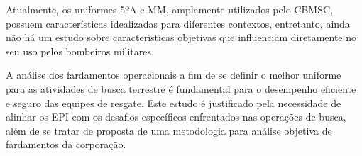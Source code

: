 	Atualmente, os uniformes 5ºA e \acrlong{MM}, amplamente utilizados pelo \acrshort{CBMSC}, possuem características idealizadas para diferentes contextos,
	  entretanto, ainda não há um estudo sobre características objetivas que influenciam diretamente no seu uso pelos bombeiros militares.
	
	  A análise dos fardamentos operacionais a fim de se definir o melhor uniforme para as atividades de busca terrestre é fundamental 
	  para o desempenho eficiente e seguro das equipes de resgate. Este estudo é justificado pela necessidade de alinhar os 
	  \acrfull{EPI} com os desafios específicos enfrentados nas operações de busca, além de se tratar de proposta de uma metodologia
	   para análise objetiva de fardamentos da corporação.

